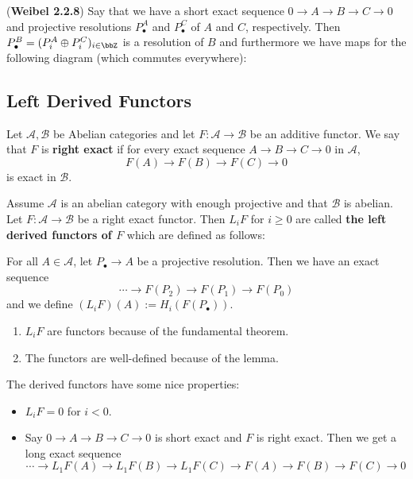 \documentclass[12pt]{article}
\begin{document}
\begin{lem}[Horseshoe]
	(\textbf{Weibel 2.2.8}) Say that we have a short exact sequence $0\to A\to B\to C\to 0$ 
	and projective resolutions $P^A_\bullet$ and $P_\bullet^C$ of $A$ and $C$, respectively.
	Then $P_\bullet^B=(P_i^A\oplus P_i^C)_{i\in\bbZ}$ is a resolution of $B$ and furthermore we have 
	maps for the following diagram (which commutes everywhere):

	\begin{center}
	\end{center}
\end{lem}

\subsection{Left Derived Functors}
\begin{defn}
	Let $\mathcal A, \mathcal B$ be Abelian categories and let $F:\mathcal A\to \mathcal B$
	be an additive functor. We say that $F$ is \textbf{right exact} if for every exact sequence
	$A\to B\to C\to 0$ in $\mathcal A$, 
	\[F(A)\to F(B)\to F(C)\to 0\]
	is exact in $\mathcal B$.
\end{defn}
\begin{defn}
	Assume $\mathcal A$ is an abelian category with enough projective and that $\mathcal B$ is abelian.
	Let $F:\mathcal A\to \mathcal B$ be a right exact functor. Then $L_iF$ for $i\ge 0$ are called
	\textbf{the left derived functors of $F$} which are defined as follows:

	For all $A\in\mathcal A$, let $P_\bullet\to A$ be a projective resolution. Then we have an 
	exact sequence
	\[\cdots\to F(P_2)\to F(P_1)\to F(P_0)\]
	and we define $(L_iF)(A):=H_i(F(P_\bullet))$.
\end{defn}
\begin{rmk}
	\begin{enumerate}
		\item $L_i F$ are functors because of the fundamental theorem.
		\item The functors are well-defined because of the lemma.
	\end{enumerate}
\end{rmk}
The derived functors have some nice properties:
\begin{itemize}
	\item $L_i F= 0$ for $i<0$.
	\item Say $0\to A\to B\to C\to 0$ is short exact and $F$ is right exact. Then we get a long exact sequence
	\[\cdots \to L_1F(A)\to L_1F(B)\to L_1F(C)\to F(A)\to F(B)\to F(C)\to 0\]
\end{itemize}
\end{document}
